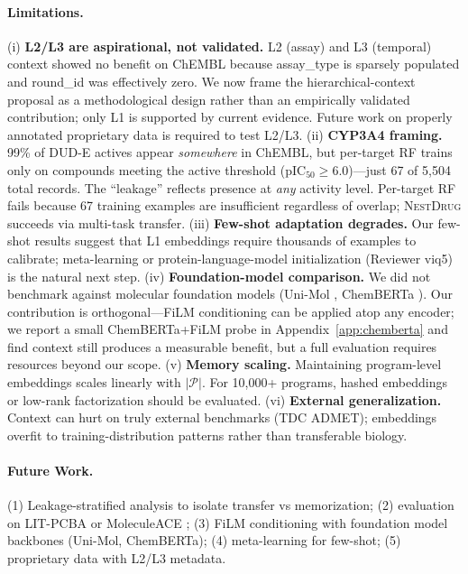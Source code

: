 \documentclass{article}
\newcommand{\methodname}{\textsc{NestDrug}}
\begin{document}
\paragraph{Limitations.} (i) \textbf{L2/L3 are aspirational, not validated.} L2 (assay) and L3 (temporal) context showed no benefit on ChEMBL because assay\_type is sparsely populated and round\_id was effectively zero. We now frame the hierarchical-context proposal as a methodological design rather than an empirically validated contribution; only L1 is supported by current evidence. Future work on properly annotated proprietary data is required to test L2/L3. (ii) \textbf{CYP3A4 framing.} 99\% of DUD-E actives appear \textit{somewhere} in ChEMBL, but per-target RF trains only on compounds meeting the active threshold (pIC$_{50} \geq 6.0$)---just 67 of 5,504 total records. The ``leakage'' reflects presence at \textit{any} activity level. Per-target RF fails because 67 training examples are insufficient regardless of overlap; \methodname{} succeeds via multi-task transfer. (iii) \textbf{Few-shot adaptation degrades.} Our few-shot results suggest that L1 embeddings require thousands of examples to calibrate; meta-learning or protein-language-model initialization (Reviewer viq5) is the natural next step. (iv) \textbf{Foundation-model comparison.} We did not benchmark against molecular foundation models (Uni-Mol \citep{zhou_2023_unimol}, ChemBERTa \citep{chithrananda_2020_chemberta}). Our contribution is orthogonal---FiLM conditioning can be applied atop any encoder; we report a small ChemBERTa+FiLM probe in Appendix~\ref{app:chemberta} and find context still produces a measurable benefit, but a full evaluation requires resources beyond our scope. (v) \textbf{Memory scaling.} Maintaining program-level embeddings scales linearly with $|\mathcal{P}|$. For 10{,}000+ programs, hashed embeddings or low-rank factorization should be evaluated. (vi) \textbf{External generalization.} Context can hurt on truly external benchmarks (TDC ADMET); embeddings overfit to training-distribution patterns rather than transferable biology.

\paragraph{Future Work.} (1) Leakage-stratified analysis to isolate transfer vs memorization; (2) evaluation on LIT-PCBA \citep{tran_2020_litpcba} or MoleculeACE \citep{van_tilborg_2024_moleculeace}; (3) FiLM conditioning with foundation model backbones (Uni-Mol, ChemBERTa); (4) meta-learning for few-shot; (5) proprietary data with L2/L3 metadata.
\end{document}
